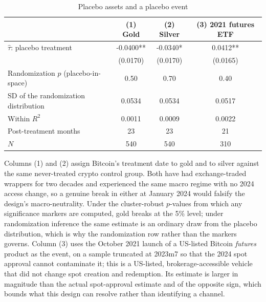 \begin{table}[t]
\centering
\begin{threeparttable}
\caption{Placebo assets and a placebo event}
\label{tab:placebos}
\begin{tabular}{lccc}
\toprule
 & (1) Gold & (2) Silver & (3) 2021 futures ETF \\
\midrule
$\hat\tau$: placebo treatment & -0.0400** & -0.0340* & 0.0412** \\
 & (0.0170) & (0.0170) & (0.0165) \\
Randomization $p$ (placebo-in-space) & 0.50 & 0.70 & 0.40 \\
SD of the randomization distribution & 0.0534 & 0.0534 & 0.0517 \\
Within $R^2$ & 0.0011 & 0.0009 & 0.0022 \\
Post-treatment months & 23 & 23 & 21 \\
$N$ & 540 & 540 & 310 \\
\bottomrule
\end{tabular}
\begin{tablenotes}[flushleft]
\footnotesize
\item Columns (1) and (2) assign Bitcoin's treatment date to gold and to silver against the same never-treated crypto control group. Both have had exchange-traded wrappers for two decades and experienced the same macro regime with no 2024 access change, so a genuine break in either at January 2024 would falsify the design's macro-neutrality. Under the cluster-robust $p$-values from which any significance markers are computed, gold breaks at the 5\% level; under randomization inference the same estimate is an ordinary draw from the placebo distribution, which is why the randomization row rather than the markers governs. Column (3) uses the October 2021 launch of a US-listed Bitcoin \emph{futures} product as the event, on a sample truncated at 2023m7 so that the 2024 spot approval cannot contaminate it; this is a US-listed, brokerage-accessible vehicle that did not change spot creation and redemption. Its estimate is larger in magnitude than the actual spot-approval estimate and of the opposite sign, which bounds what this design can resolve rather than identifying a channel.
\end{tablenotes}
\end{threeparttable}
\end{table}
